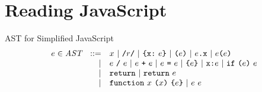 \documentclass[preprint,10pt]{sigplanconf}
\begin{document}
\section{Reading JavaScript}
\label{sec:read}


\begin{displayfigure}{\label{fig:ast}AST for Simplified JavaScript}
\[
\begin{array}{rrl}
  e \in \textit{AST} &::=& x ~|~ \texttt{/}r\texttt{/} ~|~ 
  \texttt{\{} 
  \texttt{x}
  \texttt{:}
  ~e
  \texttt{\}}
  ~|~ \texttt{(} e \texttt{)}
  ~|~ e\texttt{.}\texttt{x} ~|~ e \texttt{(} e \texttt{)}
  \\
  &|& e~\texttt{/}~e ~|~ e ~\texttt{+}~ e ~|~ e ~\texttt{=}~ e
  ~|~ \texttt{\{} e \texttt{\}} ~|~ \texttt{x} \texttt{:} e ~|~ \texttt{if}~
  \texttt{(} e \texttt{)}~e
  \\ 
  &|& \texttt{return} ~|~ \texttt{return}~e
  \\
  &|& \texttt{function}~x~
  \texttt{(}x \texttt{)}~
  \texttt{\{} e \texttt{\}} ~|~ e~e
\end{array}
\]
\end{displayfigure}
\end{document}
